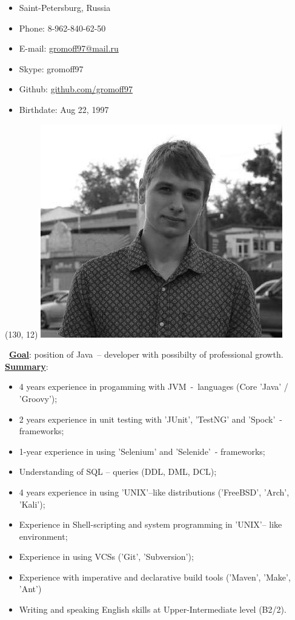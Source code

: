 \documentclass[hidelinks,12pt,a4paper,oneside]{article}
\newcommand*\ruleline[1]{\par\noindent\raisebox{.8ex}{\makebox[\linewidth]{\hrulefill\hspace{1ex}\raisebox{-.8ex}{#1}\hspace{1ex}\hrulefill}}}
\newcommand*\simpleruleline[1]{\par\noindent\raisebox{.8ex}{\makebox[\linewidth]{\hrulefill\hspace{#1}}}}
\begin{document}
%
%
%
%
\thispagestyle{empty}
{ \LARGE \ruleline{Anton Gromov} }
{\large
\begin{itemize}[topsep=5pt, itemsep=-11pt]
	\item[] Saint-Petersburg, Russia
	\item[] Phone: 8-962-840-62-50
	\item[] E-mail: \href{mailto://gromoff97@mail.ru}{gromoff97@mail.ru}
	\item[] Skype: gromoff97
	\item[] Github: \href{https://github.com/gromoff97}{github.com/gromoff97}
	\item[] Birthdate: Aug 22, 1997
\end{itemize}
\simpleruleline{1ex}
}
\begin{textblock}{20}(130, 12)
	\includegraphics[scale=0.30]{myphoto.jpg}
\end{textblock}
\
{\Large \underline{\textbf{Goal}}}: {\large position of \textquotesingle Java\textquotesingle\ -- developer with possibilty of professional growth.} \\[3px]
{\Large \underline{\textbf{Summary}}}: 
{\large
\begin{itemize}[noitemsep]
	\item 4 years experience in progamming with JVM\ -\ languages (Core 'Java' /  'Groovy');
	\item 2 years experience in unit testing with 'JUnit', 'TestNG' and 'Spock'\ - frameworks;
	\item 1-year experience in using 'Selenium' and 'Selenide'\ - frameworks;
	\item Understanding of SQL – queries (DDL, DML, DCL);
	\item 4 years experience in using 'UNIX'--like distributions ('FreeBSD', 'Arch', 'Kali');
	\item Experience in Shell-scripting and system programming in 'UNIX'-- like environment;
	\item Experience in using VCSs ('Git', 'Subversion');
	\item Experience with imperative and declarative build tools ('Maven', 'Make', 'Ant')
	\item Writing and speaking English skills at Upper-Intermediate level (B2/2).
\end{itemize}}
\end{document}

